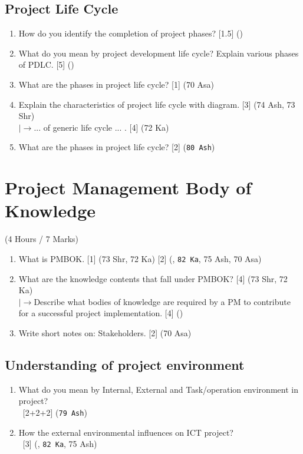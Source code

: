 \documentclass[12pt]{article}
\newcommand{\lb}{\\$\left|\rightarrow\right.$}
\newcommand{\enter}{\\\textcolor{white}{1}}
\begin{document}
  \subsection{Project Life Cycle}
    \begin{enumerate}
      \item How do you identify the completion of project phases? \hfill [1.5] ()

      \item What do you mean by project development life cycle? Explain various phases of PDLC. \hfill [5] ()

      \item What are the phases in project life cycle? \hfill [1] (70 Asa)

      \item Explain the characteristics of project life cycle with diagram. \hfill [3] (74 Ash, 73 Shr)
        \lb ... of generic life cycle ... . \hfill [4] (72 Ka)

      \item What are the phases in project life cycle? \hfill [2] (\texttt{80 Ash})
    \end{enumerate}

\pagebreak

\section{Project Management Body of Knowledge}
  \begin{center}(4 Hours / 7 Marks)\end{center}

  \begin{enumerate}
    \item What is PMBOK. \hfill [1] (73 Shr, 72 Ka) [2] (, \texttt{82 Ka}, 75 Ash, 70 Asa)

    \item What are the knowledge contents that fall under PMBOK? \hfill [4] (73 Shr, 72 Ka)
      \lb Describe what bodies of knowledge are required by a PM to contribute for a successful project implementation. \hfill [4] ()

    \item Write short notes on: Stakeholders. \hfill [2] (70 Asa)
  \end{enumerate}

  \subsection{Understanding of project environment}
    \begin{enumerate}
      \item What do you mean by Internal, External and Task/operation environment in project?
        \enter\hfill [2+2+2] (\texttt{79 Ash})
      
      \item How the external environmental influences on ICT project?
        \enter\hfill [3] (, \texttt{82 Ka}, 75 Ash)
    \end{enumerate}
\end{document}
